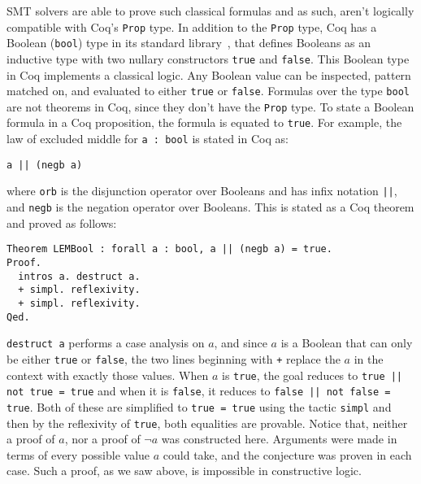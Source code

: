 \documentclass{article}
\begin{document}
	SMT solvers are able to prove 
	such classical formulas and as
	such, aren't logically compatible
	with Coq's \texttt{Prop} type. 
	In addition to the \texttt{Prop} 
	type, Coq has a Boolean 
	(\texttt{bool}) type in its standard 
	library~\cite{CoqBool}, that defines 
	Booleans as an 
	inductive type with two nullary
	constructors \texttt{true} and
	\texttt{false}. This Boolean type 
	in Coq implements a classical 
	logic. Any Boolean value can 
	be inspected, pattern matched on,
	and evaluated to either 
	\texttt{true} or \texttt{false}.
	Formulas over the type 
	\texttt{bool} are not theorems
	in Coq, since they don't have 
	the \texttt{Prop} type. To 
	state a Boolean formula in a 
	Coq proposition, the formula is 
	equated to \texttt{true}. 
	For example, the law of 
	excluded middle for 
	\texttt{a : bool} is stated in 
	Coq as: 
	\begin{center}
		\texttt{a || (negb a)}
	\end{center}
	where \texttt{orb} is the 
	disjunction operator over 
	Booleans and has 
	infix notation \texttt{||},
	and \texttt{negb} is the 
	negation operator over 
	Booleans.
	This is stated as a Coq theorem 
	and proved as follows:
	\begin{verbatim}
Theorem LEMBool : forall a : bool, a || (negb a) = true.
Proof.
  intros a. destruct a.
  + simpl. reflexivity.
  + simpl. reflexivity.
Qed.
	\end{verbatim}
	\texttt{destruct a} performs a 
	case analysis on $a$, and since $a$ 
	is a Boolean that can 
	only be either \texttt{true}
	or \texttt{false}, the two lines
	beginning with \texttt{+} 
	replace the $a$ in the context
	with exactly those values.
	When $a$ is \texttt{true}, the 
	goal reduces to 
	\texttt{true || not true = true}
	and when it is \texttt{false}, it
	reduces to 
	\texttt{false || not false = true}.
	Both of these are simplified to 
	\texttt{true = true} using the 
	tactic \texttt{simpl} and then 
	by the reflexivity of 
	\texttt{true}, both equalities
	are provable. Notice that, 
	neither a proof of $a$, nor 
	a proof of $\neg a$ was 
	constructed here. Arguments were
	made in terms of every possible 
	value $a$ could take, and the
	conjecture was proven in 
	each case. Such a proof, as we 
	saw above, is impossible in 
	constructive logic.
	
\end{document}
